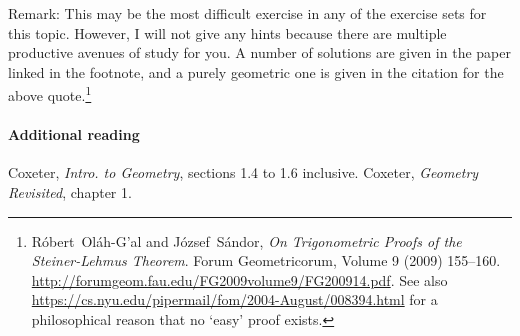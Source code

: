 \documentclass[answers]{exam}
\begin{document}
\begin{questions}
            Remark: This may be the most difficult exercise in any of the exercise sets for this topic. However, I will not give
            any hints because there are multiple productive avenues of study for you. A number of solutions are given in the paper linked
            in the footnote, and a purely geometric one is given in the citation for the above quote.\footnote{R\'obert~Ol\'ah-G'al and J\'ozsef~S\'andor,
            \textit{On Trigonometric Proofs of the Steiner-Lehmus Theorem}. Forum Geometricorum, Volume 9 (2009) 155–160.
            \url{http://forumgeom.fau.edu/FG2009volume9/FG200914.pdf}. See also \url{https://cs.nyu.edu/pipermail/fom/2004-August/008394.html} for
            a philosophical reason that no `easy' proof exists.}
\end{questions}

\paragraph{Additional reading} Coxeter, \textit{Intro. to Geometry}, sections 1.4 to 1.6 inclusive. Coxeter, \textit{Geometry Revisited}, chapter 1.
\end{document}
